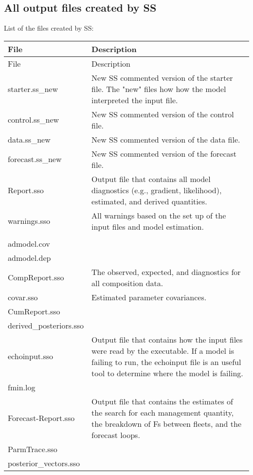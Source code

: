 \subsection{All output files created by SS}
List of the files created by SS:
\begin{center}
	\begin{longtable}{p{5cm} p{11cm}}
		File & Description \\
		\hline
		\endfirsthead
		
		File & Description\\
		\hline
		\endhead
		
		\hline
		\endfoot
		
		\endlastfoot
		starter.ss\_new & New SS commented version of the starter file.  The "new" files how how the model interpreted the input file. \\
		control.ss\_new & New SS commented version of the control file.\\
		data.ss\_new & New SS commented version of the data file.\\
		forecast.ss\_new & New SS commented version of the forecast file.\\
		Report.sso &  Output file that contains all model diagnostics (e.g., gradient, likelihood), estimated, and derived quantities.\\
		warnings.sso & All warnings based on the set up of the input files and model estimation. \\
		 & \\
		admodel.cov & \\
		admodel.dep & \\
		CompReport.sso & The observed, expected, and diagnostics for all composition data.\\
		covar.sso & Estimated parameter covariances.\\
		CumReport.sso & \\
		derived\_posteriors.sso & \\
		echoinput.sso & Output file that contains how the input files were read by the executable.  If a model is failing to run, the echoinput file is an useful tool to determine where the model is failing.\\
		fmin.log & \\
		Forecast-Report.sso & Output file that contains the estimates of the search for each management quantity, the breakdown of Fs between fleets, and the forecast loops.\\
		ParmTrace.sso & \\
		posterior\_vectors.sso & \\

\end{longtable}
\end{center}
